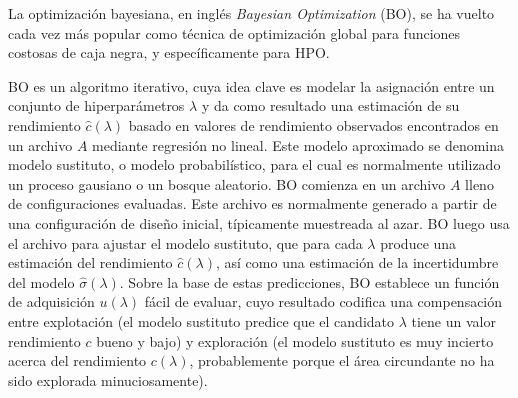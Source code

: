 
La optimización bayesiana, en inglés \textit{Bayesian Optimization} (BO), se ha vuelto cada vez más popular como técnica de optimización global para funciones costosas de caja negra, y específicamente para HPO.

BO es un algoritmo iterativo, cuya idea clave es modelar la asignación entre un conjunto de hiperparámetros $\lambda$ y da como resultado una estimación de su rendimiento $\hat{c}(\lambda)$ basado en valores de rendimiento observados encontrados en un archivo $A$ mediante regresión no lineal. Este modelo aproximado se denomina modelo sustituto, o modelo probabilístico, para el cual es normalmente utilizado un proceso gausiano o un bosque aleatorio. BO comienza en un archivo $A$ lleno de configuraciones evaluadas. Este archivo es normalmente generado a partir de una configuración de diseño inicial, típicamente muestreada al azar. BO luego usa el archivo para ajustar el modelo sustituto, que para cada $\lambda$ produce una estimación del rendimiento $\hat{c}(\lambda)$, así como una estimación de la incertidumbre del modelo $\hat{\sigma}(\lambda)$. Sobre la base de estas predicciones, BO establece un función de adquisición $u(\lambda)$ fácil de evaluar, cuyo resultado codifica una compensación entre explotación (el modelo sustituto predice que el candidato $\lambda$ tiene un valor rendimiento $c$ bueno y bajo) y exploración (el modelo sustituto es muy incierto acerca del rendimiento $c(\lambda)$, probablemente porque el área circundante no ha sido explorada minuciosamente).

